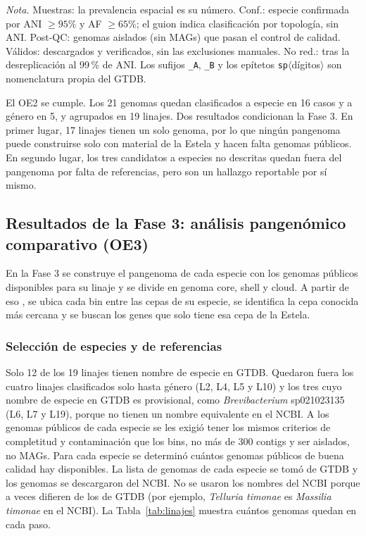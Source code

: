 \begin{table}[htbp]
\vspace{0.5em}
\begin{minipage}{0.95\textwidth}
\footnotesize
\textit{Nota.} Muestras: la prevalencia espacial es su número. Conf.: especie
confirmada por ANI $\geq 95\%$ y AF $\geq 65\%$; el guion indica
clasificación por topología, sin ANI. Post-QC: genomas aislados (sin MAGs) que
pasan el control de calidad. Válidos: descargados y verificados, sin las
exclusiones manuales. No red.: tras la desreplicación al 99\,\% de ANI. Los
sufijos \texttt{\_A}, \texttt{\_B} y los epítetos
\texttt{sp}$\langle$dígitos$\rangle$ son nomenclatura propia del GTDB.
\end{minipage}
\end{table}

El OE2 se cumple. Los 21 genomas quedan clasificados a especie en 16 casos y a
género en 5, y agrupados en 19 linajes. Dos resultados condicionan la Fase 3. En
primer lugar, 17 linajes tienen un solo genoma, por lo que ningún pangenoma
puede construirse solo con material de la Estela y hacen falta genomas públicos.
En segundo lugar, los tres candidatos a especies no descritas quedan fuera del
pangenoma por falta de referencias, pero son un hallazgo reportable por sí
mismo.

\subsection{Resultados de la Fase 3: análisis pangenómico comparativo (OE3)}
\label{subsec:res_fase3}

En la Fase 3 se construye el pangenoma de cada especie con los genomas públicos
disponibles para su linaje y se divide en genoma core, shell y cloud. A partir de eso
, se ubica cada bin entre las cepas
de su especie, se identifica la cepa conocida más cercana y se buscan los genes que
solo tiene esa cepa de la Estela.

\subsubsection{Selección de especies y de referencias}
\label{subsubsec:res_seleccion}

Solo 12 de los 19 linajes tienen nombre de especie en GTDB. Quedaron fuera los cuatro linajes clasificados solo hasta género (L2, L4, L5 y
L10) y los tres cuyo nombre de especie en GTDB es provisional, como
\textit{Brevibacterium} sp021023135 (L6, L7 y L19), porque no tienen un nombre
equivalente en el NCBI. A los genomas públicos de cada especie se
les exigió tener los mismos criterios de completitud y contaminación que los bins, no más
de 300 contigs y ser aislados, no MAGs. Para cada especie se determinó cuántos genomas públicos de buena calidad hay
disponibles. La lista de genomas de cada especie se tomó de GTDB y los genomas se descargaron del NCBI. 
No se usaron los nombres del
NCBI porque a veces difieren de los de GTDB (por ejemplo, \textit{Telluria
timonae} es \textit{Massilia timonae} en el NCBI). La Tabla~\ref{tab:linajes}
muestra cuántos genomas quedan en cada paso.

